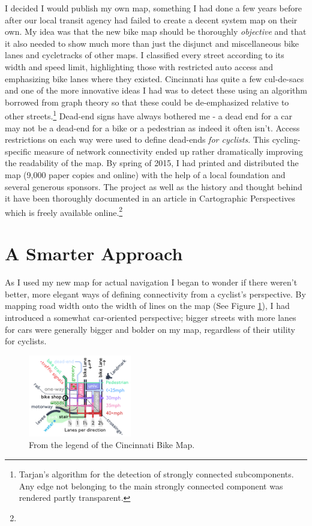 \documentclass{article}
\begin{document}
		I decided I would publish my own map, something I had done a few years before after our local transit agency had failed to create a decent system map on their own.
		My idea was that the new bike map should be thoroughly \textit{objective} and that it also needed to show much more than just the disjunct and miscellaneous bike lanes and cycletracks of other maps. I classified every street according to its width and speed limit, highlighting those with restricted auto access and emphasizing bike lanes where they existed. Cincinnati has quite a few cul-de-sacs and one of the more innovative ideas I had was to detect these using an algorithm borrowed from graph theory so that these could be de-emphasized relative to other streets.\footnote{
			Tarjan's algorithm for the detection of strongly connected subcomponents. Any edge not belonging to the main strongly connected component was rendered partly transparent.
		} Dead-end signs have always bothered me - a dead end for a car may not be a dead-end for a bike or a pedestrian as indeed it often isn't. Access restrictions on each way were used to define dead-ends \textit{for cyclists}. 
		This cycling-specific measure of network connectivity ended up rather dramatically improving the readability of the map. 
		By spring of 2015, I had printed and distributed the map (9,000 paper copies and online) with the help of a local foundation and several generous sponsors. The project as well as the history and thought behind it have been thoroughly documented in an article in Cartographic Perspectives which is freely available online.\footnote{
		}
	
	\section*{A Smarter Approach}
	
		As I used my new map for actual navigation I began to wonder if there weren't better, more elegant ways of defining connectivity from a cyclist's perspective. By mapping road width onto the width of lines on the map (See Figure \ref{fig:legend}), I had introduced a somewhat car-oriented perspective; bigger streets with more lanes for cars were generally bigger and bolder on my map, regardless of their utility for cyclists. 
		
		\begin{figure}[h!]
			\centering
			\includegraphics[width=0.4\textwidth]{legend}
			\caption{From the legend of the Cincinnati Bike Map.}
			\label{fig:legend}
		\end{figure}
		
\end{document}
